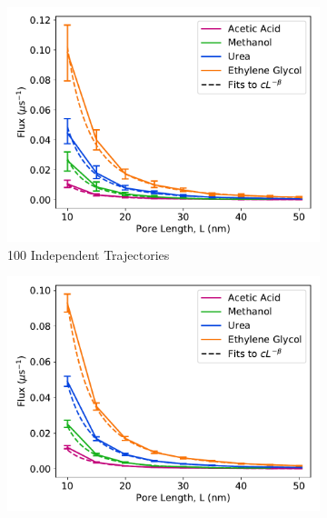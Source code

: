\documentclass{article}
\begin{document}
%  
  
  \begin{figure}
  \centering
  \begin{subfigure}{0.45\textwidth}
  \includegraphics[width=\textwidth]{flux_curves_N100.pdf}
  \caption{100 Independent Trajectories}\label{fig:N100}
  \end{subfigure}
  \begin{subfigure}{0.45\textwidth}
  \includegraphics[width=\textwidth]{flux_curves_N1000.pdf}

\end{subfigure}
\end{figure}
\end{document}
